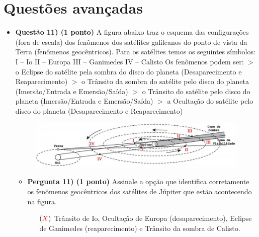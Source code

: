 \documentclass[a4paper, 12pt]{article}
\newcommand{\red}[1]{\textcolor{red}{#1}}
\begin{document}
    \section*{Questões avançadas}
        \begin{flushleft} \begin{itemize}
            \item \textbf{Questão 11) (1 ponto)} A figura abaixo traz o esquema das configurações (fora de escala) dos fenômenos dos satélites galileanos do ponto de vista da Terra (fenômenos geocêntricos). Para os satélites temos os seguintes símbolos: \linebreak\linebreak I – Io \linebreak II – Europa \linebreak III – Ganimedes \linebreak IV – Calisto \linebreak\linebreak Os fenômenos podem ser: \linebreak $>$ o Eclipse do satélite pela sombra do disco do planeta (Desaparecimento e Reaparecimento) \linebreak $>$ o Trânsito da sombra do satélite pelo disco do planeta (Imersão/Entrada e Emersão/Saída) \linebreak $>$ o Trânsito do satélite pelo disco do planeta (Imersão/Entrada e Emersão/Saída) \linebreak $>$ a Ocultação do satélite pelo disco do planeta (Desaparecimento e Reaparecimento)
                \begin{figure}[H]
                    \centering
                    \includegraphics[scale=0.4]{img/11.png}
                \end{figure}
                \begin{itemize}
                    \item \textbf{Pergunta 11) (1 ponto)} Assinale a opção que identifica corretamente os fenômenos geocêntricos dos satélites de Júpiter que estão acontecendo na figura.
                        \begin{itemize}
                            \item[$(\red{X})$] Trânsito de Io, Ocultação de Europa (desaparecimento), Eclipse de Ganimedes (reaparecimento) e Trânsito da sombra de Calisto.

\end{itemize}
\end{itemize}
\end{itemize}
\end{flushleft}
\end{document}

